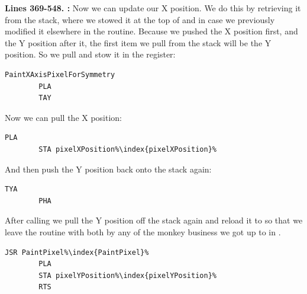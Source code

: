 \textbf{Lines 369-548. :} Now we can update our X position. We do this by retrieving it
from the stack, where we stowed it at the top of  and in case we previously modified it elsewhere in the routine. 
Because we pushed the X position first, and the Y position after it, the first item we pull from the stack will be the Y position.
So we pull and stow it in the  register:

\begin{lstlisting}[escapechar=\%]
PaintXAxisPixelForSymmetry    
        PLA 
        TAY 
\end{lstlisting}

Now we can pull the X position:
\begin{lstlisting}[escapechar=\%]
        PLA 
        STA pixelXPosition%\index{pixelXPosition}%
\end{lstlisting}

And then push the Y position back onto the stack again:
\begin{lstlisting}[escapechar=\%]
        TYA 
        PHA 
\end{lstlisting}

After calling  we pull the Y position off the stack again and reload it to  so that we leave
the routine with both  by any of the monkey business we got up to in .

\begin{lstlisting}[escapechar=\%]
        JSR PaintPixel%\index{PaintPixel}%
        PLA 
        STA pixelYPosition%\index{pixelYPosition}%
        RTS 
\end{lstlisting}

\clearpage
\rhead[]{\leftmark}

